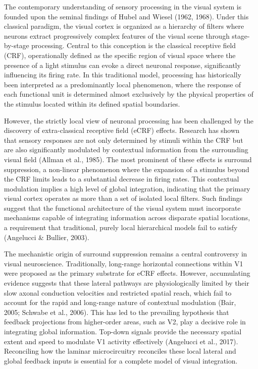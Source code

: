 The contemporary understanding of sensory processing in the visual system is founded upon the seminal findings of Hubel and Wiesel (1962, 1968). Under this classical paradigm, the visual cortex is organized as a hierarchy of filters where neurons extract progressively complex features of the visual scene through stage-by-stage processing. Central to this conception is the classical receptive field (CRF), operationally defined as the specific region of visual space where the presence of a light stimulus can evoke a direct neuronal response, significantly influencing its firing rate. In this traditional model, processing has historically been interpreted as a predominantly local phenomenon, where the response of each functional unit is determined almost exclusively by the physical properties of the stimulus located within its defined spatial boundaries.

However, the strictly local view of neuronal processing has been challenged by the discovery of extra-classical receptive field (eCRF) effects. Research has shown that sensory responses are not only determined by stimuli within the CRF but are also significantly modulated by contextual information from the surrounding visual field (Allman et al., 1985). The most prominent of these effects is surround suppression, a non-linear phenomenon where the expansion of a stimulus beyond the CRF limits leads to a substantial decrease in firing rates. This contextual modulation implies a high level of global integration, indicating that the primary visual cortex operates as more than a set of isolated local filters. Such findings suggest that the functional architecture of the visual system must incorporate mechanisms capable of integrating information across disparate spatial locations, a requirement that traditional, purely local hierarchical models fail to satisfy (Angelucci \& Bullier, 2003).

The mechanistic origin of surround suppression remains a central controversy in visual neuroscience. Traditionally, long-range horizontal connections within V1 were proposed as the primary substrate for eCRF effects. However, accumulating evidence suggests that these lateral pathways are physiologically limited by their slow axonal conduction velocities and restricted spatial reach, which fail to account for the rapid and long-range nature of contextual modulation (Bair, 2005; Schwabe et al., 2006). This has led to the prevailing hypothesis that feedback projections from higher-order areas, such as V2, play a decisive role in integrating global information. Top-down signals provide the necessary spatial extent and speed to modulate V1 activity effectively (Angelucci et al., 2017). Reconciling how the laminar microcircuitry reconciles these local lateral and global feedback inputs is essential for a complete model of visual integration.


